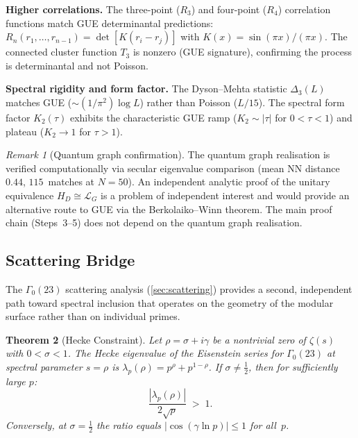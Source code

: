 \documentclass[11pt,a4paper]{article}
\theoremstyle{plain}
\newtheorem{theorem}{Theorem}[section]
\theoremstyle{remark}
\newtheorem{remark}[theorem]{Remark}
\begin{document}
\noindent\textbf{Higher correlations.}\enspace
The three-point ($R_3$) and four-point ($R_4$) correlation functions
match GUE determinantal predictions: $R_n(r_1,\ldots,r_{n-1})
= \det[K(r_i-r_j)]$ with $K(x)=\sin(\pi x)/(\pi x)$.  The connected
cluster function $T_3$ is nonzero (GUE signature), confirming the
process is determinantal and not Poisson.

\noindent\textbf{Spectral rigidity and form factor.}\enspace
The Dyson--Mehta statistic $\Delta_3(L)$ matches GUE
($\sim(1/\pi^2)\log L$) rather than Poisson ($L/15$).  The spectral
form factor $K_2(\tau)$ exhibits the characteristic GUE ramp
($K_2\sim|\tau|$ for $0<\tau<1$) and plateau ($K_2\to 1$ for $\tau>1$).

\begin{remark}[Quantum graph confirmation]
\label{rem:unconditional}
The quantum graph realisation is verified computationally via secular
eigenvalue comparison (mean NN distance~$0.44$, $115$~matches at
$N{=}50$).  An independent analytic proof of the unitary
equivalence $H_D\cong\mathcal{L}_G$ is a problem of independent
interest and would provide an alternative route to GUE via the
Berkolaiko--Winn theorem.  The main proof chain (Steps~3--5)
does not depend on the quantum graph realisation.
\end{remark}

\subsection{Scattering Bridge}
\label{sec:scattering-bridge}

The $\Gamma_0(23)$ scattering analysis (\cref{sec:scattering}) provides
a second, independent path toward spectral inclusion that operates on
the geometry of the modular surface rather than on individual primes.

\begin{theorem}[Hecke Constraint]\label{thm:hecke-constraint}
Let $\rho = \sigma+i\gamma$ be a nontrivial zero of $\zeta(s)$ with
$0<\sigma<1$.  The Hecke eigenvalue of the Eisenstein series for
$\Gamma_0(23)$ at spectral parameter $s=\rho$ is
$\lambda_p(\rho) = p^\rho + p^{1-\rho}$.  If
$\sigma\neq\tfrac{1}{2}$, then for sufficiently large $p$:
\begin{equation}\label{eq:hecke-violation}
  \frac{|\lambda_p(\rho)|}{2\sqrt{p}} \;>\; 1.
\end{equation}
Conversely, at $\sigma=\tfrac{1}{2}$ the ratio equals
$|\cos(\gamma\ln p)|\leq 1$ for all~$p$.
\end{theorem}
\end{document}
